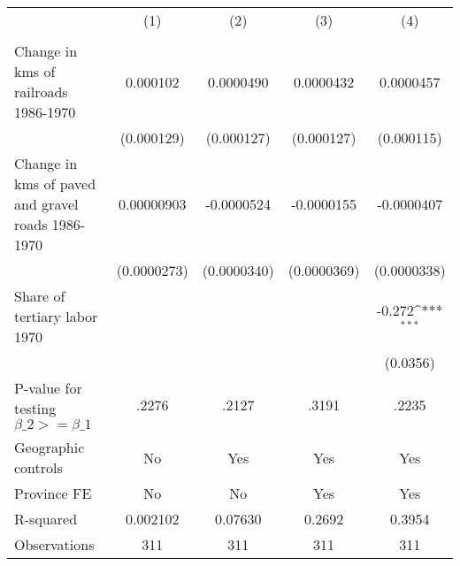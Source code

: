 {
\def\sym#1{\ifmmode^{#1}\else\(^{#1}\)\fi}
\begin{tabular}{l*{4}{c}}
\hline\hline
                &\multicolumn{1}{c}{(1)}&\multicolumn{1}{c}{(2)}&\multicolumn{1}{c}{(3)}&\multicolumn{1}{c}{(4)}\\
                &\multicolumn{1}{c}{}&\multicolumn{1}{c}{}&\multicolumn{1}{c}{}&\multicolumn{1}{c}{}\\
\hline
Change in kms of railroads 1986-1970& 0.000102         &0.0000490         &0.0000432         &0.0000457         \\
                &(0.000129)         &(0.000127)         &(0.000127)         &(0.000115)         \\
[1em]
Change in kms of paved and gravel roads 1986-1970&0.00000903         &-0.0000524         &-0.0000155         &-0.0000407         \\
                &(0.0000273)         &(0.0000340)         &(0.0000369)         &(0.0000338)         \\
[1em]
Share of tertiary labor 1970&                  &                  &                  &   -0.272\sym{***}\\
                &                  &                  &                  & (0.0356)         \\
\hline
P-value for testing $\beta\_{2} >= \beta\_{1}$&    .2276         &    .2127         &    .3191         &    .2235         \\
Geographic controls&       No         &      Yes         &      Yes         &      Yes         \\
Province FE     &       No         &       No         &      Yes         &      Yes         \\
R-squared       & 0.002102         &  0.07630         &   0.2692         &   0.3954         \\
Observations    &      311         &      311         &      311         &      311         \\
\hline\hline
\end{tabular}
}
